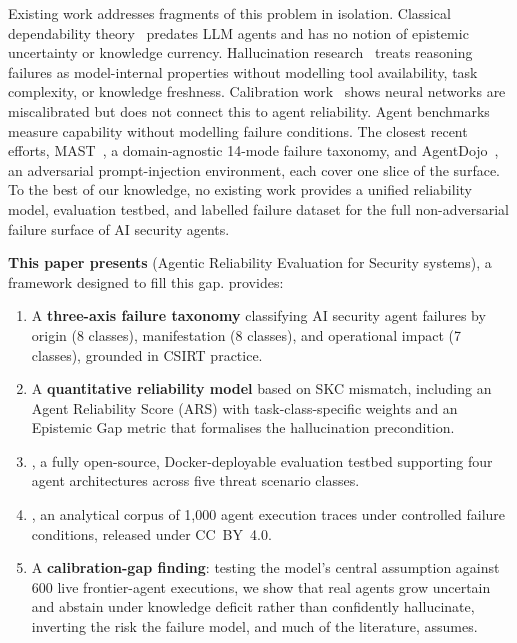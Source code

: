 Existing work addresses fragments of this problem in isolation. Classical
dependability theory~\cite{avizienis2004} predates LLM agents and has no
notion of epistemic uncertainty or knowledge currency.
Hallucination research~\cite{llmagent_halluc_survey2025} treats reasoning
failures as model-internal properties without modelling tool availability,
task complexity, or knowledge freshness. Calibration
work~\cite{guo2017calibration} shows neural networks are miscalibrated but
does not connect this to agent reliability. Agent
benchmarks~\cite{liu2023agentbench} measure capability
without modelling failure conditions. The closest
recent efforts, MAST~\cite{cemri2025mast}, a domain-agnostic 14-mode
failure taxonomy, and AgentDojo~\cite{debenedetti2024agentdojo}, an
adversarial prompt-injection environment, each cover one slice of
the surface. To the best of our knowledge, no existing work provides a
unified reliability model, evaluation testbed, and labelled failure
dataset for the full non-adversarial failure surface of AI security
agents.

\textbf{This paper presents \ARES{}} (Agentic Reliability Evaluation for
Security systems), a framework designed to fill this gap. \ARES{} provides:
\begin{enumerate}[noitemsep, leftmargin=*]
  \item A \textbf{three-axis failure taxonomy} classifying AI security agent
    failures by origin (8 classes), manifestation (8 classes), and operational
    impact (7 classes), grounded in CSIRT practice.
  \item A \textbf{quantitative reliability model} based on SKC mismatch,
    including an Agent Reliability Score (ARS) with task-class-specific
    weights and an Epistemic Gap metric that formalises the hallucination
    precondition.
  \item \textbf{\ARESBench{}}, a fully open-source, Docker-deployable
    evaluation testbed supporting four agent architectures across five
    threat scenario classes.
  \item \textbf{\SAFK{}}, an analytical corpus of 1,000 agent execution
    traces under controlled failure conditions, released under CC~BY~4.0.
  \item A \textbf{calibration-gap finding}: testing the model's central
    assumption against 600 live frontier-agent executions, we show that
    real agents grow uncertain and abstain under knowledge deficit
    rather than confidently hallucinate, inverting the risk the failure
    model, and much of the literature, assumes.
\end{enumerate}

